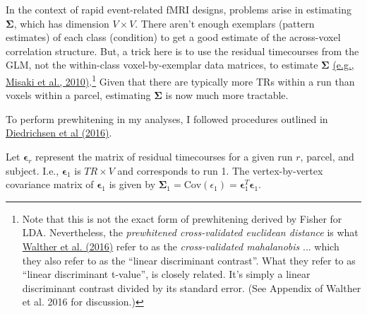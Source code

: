 \documentclass{article}\usepackage[]{graphicx}\usepackage[]{color}
\begin{document}
In the context of rapid event-related fMRI designs, problems arise in estimating $\mathbf{\Sigma}$, which has dimension $V \times V$.
There aren't enough exemplars (pattern estimates) of each class (condition) to get a good estimate of the across-voxel correlation structure.
But, a trick here is to use the residual timecourses from the GLM, not the within-class voxel-by-exemplar data matrices, to estimate $\mathbf{\Sigma}$ \href{https://doi.org/10.1016/j.neuroimage.2010.05.051}{(e.g., Misaki et al., 2010)}.\footnote{
Note that this is not the exact form of prewhitening derived by Fisher for LDA.
Nevertheless, the \textit{prewhitened cross-validated euclidean distance} is what \href{https://doi.org/10.1016/j.neuroimage.2015.12.012}{Walther et al. (2016)} refer to as the \textit{cross-validated mahalanobis} ... which they also refer to as the ``linear discriminant contrast''.
What they refer to as ``linear discriminant t-value'', is closely related.
It's simply a linear discriminant contrast divided by its standard error.
(See Appendix of Walther et al. 2016 for discussion.)
}
Given that there are typically more TRs within a run than voxels within a parcel, estimating $\mathbf{\Sigma}$ is now much more tractable.



To perform prewhitening in my analyses, I followed procedures outlined in \href{https://arxiv.org/abs/1607.01371}{Diedrichsen et al (2016)}.

Let $\mathbf{\epsilon}_r$ represent the matrix of residual timecourses for a given run $r$, parcel, and subject.
I.e., $\mathbf{\epsilon}_1$ is $TR \times V$ and corresponds to run 1.
The vertex-by-vertex covariance matrix of $\mathbf{\epsilon}_1$ is given by $\mathbf{\Sigma}_1 = \text{Cov}(\epsilon_1) = \mathbf{\epsilon}_1^T\mathbf{\epsilon}_1$.
\end{document}
